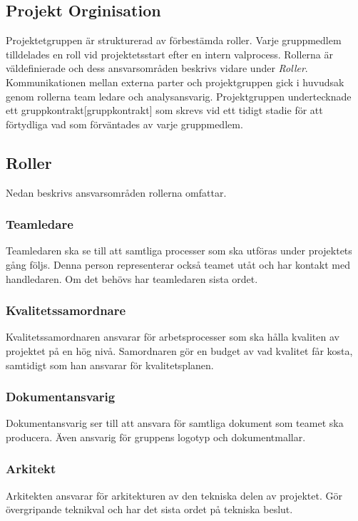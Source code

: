 \subsection*{Projekt Orginisation}
Projektetgruppen är strukturerad av förbestämda roller. Varje gruppmedlem tilldelades en roll vid projektetsstart efter en intern valprocess. Rollerna är väldefinierade och dess ansvarsområden beskrivs vidare under \textit{Roller}. Kommunikationen mellan externa parter och projektgruppen gick i huvudsak genom rollerna team ledare och analysansvarig. Projektgruppen undertecknade ett gruppkontrakt[gruppkontrakt] som skrevs vid ett tidigt stadie för att förtydliga vad som förväntades av varje gruppmedlem.

\subsection*{Roller}
Nedan beskrivs ansvarsområden rollerna omfattar.

\subsubsection*{Teamledare}
Teamledaren ska se till att samtliga processer som ska utföras under projektets gång följs. Denna person representerar också teamet utåt och har kontakt med handledaren. Om det behövs har teamledaren sista ordet.

\subsubsection*{Kvalitetssamordnare}
Kvalitetssamordnaren ansvarar för arbetsprocesser som ska hålla kvaliten av projektet på en hög nivå. Samordnaren gör en budget av vad kvalitet får kosta, samtidigt som han ansvarar för kvalitetsplanen.

\subsubsection*{Dokumentansvarig}
Dokumentansvarig ser till att ansvara för samtliga dokument som teamet ska producera. Även ansvarig för gruppens logotyp och dokumentmallar.

\subsubsection*{Arkitekt}
Arkitekten ansvarar för arkitekturen av den tekniska delen av projektet. Gör övergripande teknikval och har det sista ordet på tekniska beslut.

